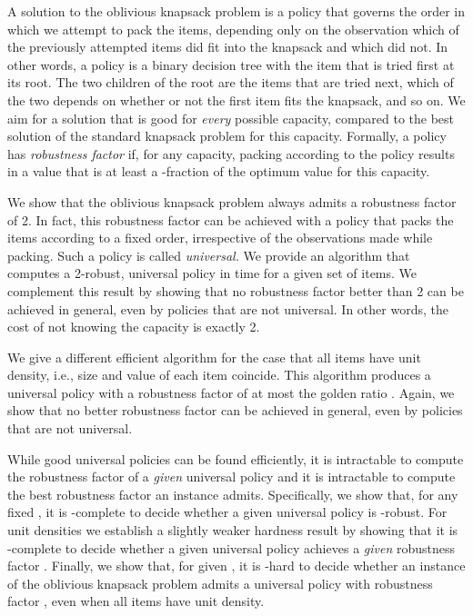 \documentclass[11pt]{article}
\begin{document}
A solution to the oblivious knapsack problem is a policy that governs
the order in which we attempt to pack the items, depending only on
the observation which of the previously attempted items did fit into
the knapsack and which did not. In other words, a policy is a binary
decision tree with the item that is tried first at its root. The two
children of the root are the items that are tried next, which of the
two depends on whether or not the first item fits the knapsack, and
so on. We aim for a solution that is good for \emph{every} possible
capacity, compared to the best solution of the standard knapsack problem
for this capacity. Formally, a policy has \emph{robustness factor
 }if, for any capacity, packing according to the policy results
in a value that is at least a -fraction of the optimum
value for this capacity.

We show that the oblivious knapsack problem always admits a robustness
factor of 2. In fact, this robustness factor can be achieved with
a policy that packs the items according to a fixed order, irrespective
of the observations made while packing. Such a policy is called \emph{universal.
}We provide an algorithm that computes a 2-robust, universal policy
in time  for a given set of  items. We complement
this result by showing that no robustness factor better than 2 can
be achieved in general, even by policies that are not universal. In
other words, the cost of not knowing the capacity is exactly 2.

We give a different efficient algorithm for the case that all items
have unit density, i.e., size and value of each item coincide. This
algorithm produces a universal policy with a robustness factor of
at most the golden ratio . Again, we show that
no better robustness factor can be achieved in general, even by policies
that are not universal. 

While good universal policies can be found efficiently, it is intractable
to compute the robustness factor of a \emph{given} universal policy
and it is intractable to compute the best robustness factor an instance
admits. Specifically, we show that, for any\emph{ }fixed\emph{ },
it is -complete to decide whether a given universal policy
is -robust. For unit densities we establish a slightly weaker
hardness result by showing that it is -complete to decide
whether a given universal policy achieves a \emph{given} robustness
factor . Finally, we show that, for given , it is
-hard to decide whether an instance of the oblivious
knapsack problem admits a universal policy with robustness factor
, even when all items have unit density.
\end{document}
